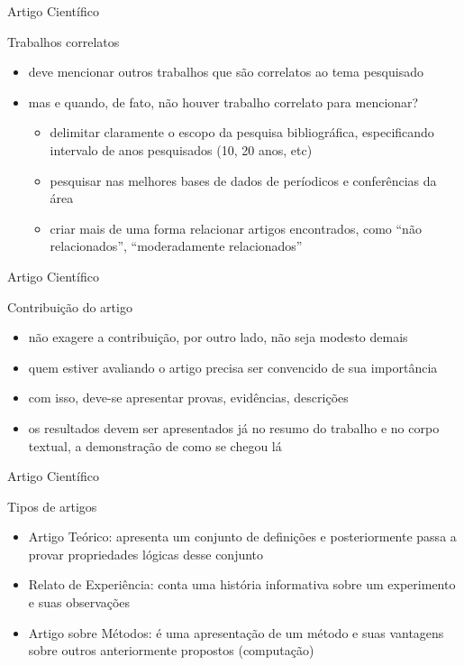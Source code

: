 \begin{frame}{Artigo Científico}
    \begin{block}{Trabalhos correlatos}
        \begin{itemize}
            \item deve mencionar outros trabalhos que são correlatos ao tema pesquisado
            \item mas e quando, de fato, não houver trabalho correlato para mencionar?
            \begin{itemize}
                 \item delimitar claramente o escopo da pesquisa bibliográfica, especificando intervalo de anos pesquisados (10, 20 anos, etc)
                 \item pesquisar nas melhores bases de dados de períodicos e conferências da área
                 \item criar mais de uma forma relacionar artigos encontrados, como ``não relacionados'', ``moderadamente relacionados''
            \end{itemize}
        \end{itemize}
    \end{block}
\end{frame}

\begin{frame}{Artigo Científico}
    \begin{block}{Contribuição do artigo}
        \begin{itemize}
            \item não exagere a contribuição, por outro lado, não seja modesto demais
            \item quem estiver avaliando o artigo precisa ser convencido de sua importância
            \item com isso, deve-se apresentar provas, evidências, descrições
            \item os resultados devem ser apresentados já no resumo do trabalho e no corpo textual, a demonstração de como se chegou lá
        \end{itemize}
    \end{block}
\end{frame}

\begin{frame}{Artigo Científico}
    \begin{block}{Tipos de artigos}
        \begin{itemize}
            \item Artigo Teórico: apresenta um conjunto de definições e posteriormente passa a provar propriedades lógicas desse conjunto
            \item Relato de Experiência: conta uma história informativa sobre um experimento e suas observações
            \item Artigo sobre Métodos: é uma apresentação de um método e suas vantagens sobre outros anteriormente propostos (computação)
        \end{itemize}
    \end{block}
\end{frame}

